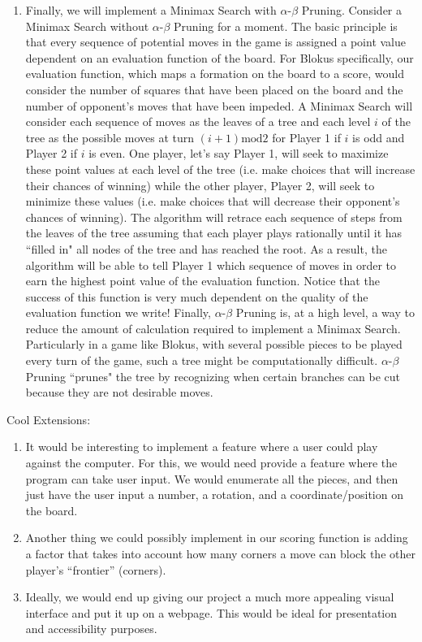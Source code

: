\documentclass[11pt]{article}
\begin{document}
\begin{enumerate}
\item Finally, we will implement a Minimax Search with $\alpha$-$\beta$ Pruning. Consider a Minimax Search without $\alpha$-$\beta$ Pruning for a moment. The basic principle is that every sequence of potential moves in the game is assigned a point value dependent on an evaluation function of the board. For Blokus specifically, our evaluation function, which maps a formation on the board to a score, would consider the number of squares that have been placed on the board and the number of opponent's moves that have been impeded. A Minimax Search will consider each sequence of moves as the leaves of a tree and each level $i$ of the tree as the possible moves at turn $(i+1)\text{mod}2$ for Player 1 if $i$ is odd and Player 2 if $i$ is even. One player, let's say Player 1, will seek to maximize these point values at each level of the tree (i.e. make choices that will increase their chances of winning) while the other player, Player 2, will seek to minimize these values (i.e. make choices that will decrease their opponent's chances of winning). The algorithm will retrace each sequence of steps from the leaves of the tree assuming that each player plays rationally until it has ``filled in" all nodes of the tree and has reached the root. As a result, the algorithm will be able to tell Player 1 which sequence of moves in order to earn the highest point value of the evaluation function. Notice that the success of this function is very much dependent on the quality of the evaluation function we write! Finally, $\alpha$-$\beta$ Pruning is, at a high level, a way to reduce the amount of calculation required to implement a Minimax Search. Particularly in a game like Blokus, with several possible pieces to be played every turn of the game, such a tree might be computationally difficult. $\alpha$-$\beta$ Pruning ``prunes" the tree by recognizing when certain branches can be cut because they are not desirable moves.

\end{enumerate}
Cool Extensions:
\begin{enumerate}
\item It would be interesting to implement a feature where a user could play against the computer. For this, we would need provide a feature where the program can take user input. We would enumerate all the pieces, and then just have the user input a number, a rotation, and a coordinate/position on the board.
\item Another thing we could possibly implement in our scoring function is adding a factor that takes into account how many corners a move can block the other player's ``frontier'' (corners).
\item Ideally, we would end up giving our project a much more appealing visual interface and put it up on a webpage. This would be ideal for presentation and accessibility purposes.
\end{enumerate} 
\end{document}

